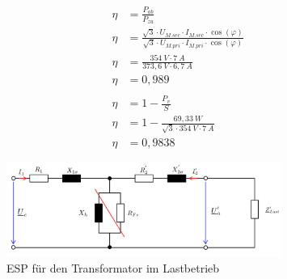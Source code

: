 \begin{enumerate}[label=\alph*)]
\begin{align*}
		      \\
		      \eta   & = \frac{P_{ab}}{P_{zu}}                                                                                                       \\
		      \eta   & = \frac{\sqrt{3}\cdot U_{M.sec}\cdot I_{M.sec}\cdot \cos(\varphi)}{\sqrt{3}\cdot U_{M.pri}\cdot I_{M.pri}\cdot \cos(\varphi)} \\
		      \eta   & = \frac{354\ V\cdot 7\ A}{373,6\ V\cdot 6,7\ A}                                                                               \\
		      \eta   & = 0,989                                                                                                                       \\
		      \\
		      \eta   & = 1-\frac{P_{v}}{S}                                                                                                           \\
		      \eta   & = 1- \frac{69,33\ W}{\sqrt{3}\cdot 354\ V\cdot 7\ A }                                                                         \\
		      \eta   & = 0,9838
	      \end{align*}

	      \begin{figure}[h!]
		      \begin{center}
			      \includegraphics[width=0.8\textwidth]{img/4.2.2.1}
		      \end{center}
		      \caption{ESP für den Transformator im Lastbetrieb}\label{img:4.2.2.1}
	      \end{figure}


\end{enumerate}
